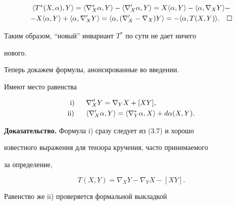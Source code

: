 \begin{multline*} 


\la T^*(X,\alpha),Y\ra=\la\nabla^*_X\alpha,Y\ra- 


\la\nabla'_X\alpha,Y\ra=X\la\alpha,Y\ra- 


\la\alpha,\nabla_X Y\ra - \\ 


-X\la\alpha,Y\ra+\la\alpha,\nabla'_X Y\ra= 


\la\alpha,(\nabla'_X-\nabla_X)Y\ra=- 


\la\alpha,T(X,Y)\ra.\quad\square 


\end{multline*} 


 


Таким образом, ``новый'' инвариант $T^*$ по сути не дает ничего 


нового. 


\medskip


 


Теперь докажем формулы, анонсированные во введении. 


 


\begin{lems} Имеют место равенства 


\begin{alignat*}{2} 


&\phantom{i}\mathrm{i}) &\ \; & \nabla''_X Y=\nabla_Y X+[XY], \\ 


&\mathrm{ii}) & \ \; &\la\nabla'_X\alpha,Y\ra= 


\la\nabla^*_Y\alpha,X\ra+d\alpha(X,Y). 


\end{alignat*} 


\end{lems} 


 


{\bf Доказательство.} Формула i) сразу следует из (3.7) и хорошо 


известного выражения для тензора кручения, часто принимаемого  


за определение, 


$$ 


T(X,Y)=\nabla_X Y-\nabla_Y X-[XY]. 


$$ 


Равенство же ii) проверяется формальной выкладкой 


